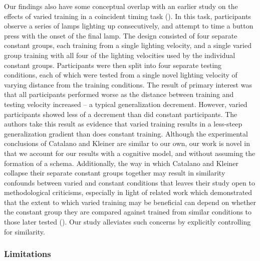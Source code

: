 \documentclass[
  11pt,
  letterpaper,
]{article}
\begin{document}
Our findings also have some conceptual overlap with an earlier study on
the effects of varied training in a coincident timing task
(). In this task, participants observe a series of lamps
lighting up consecutively, and attempt to time a button press with the
onset of the final lamp. The design consisted of four separate constant
groups, each training from a single lighting velocity, and a single
varied group training with all four of the lighting velocities used by
the individual constant groups. Participants were then split into four
separate testing conditions, each of which were tested from a single
novel lighting velocity of varying distance from the training
conditions. The result of primary interest was that all participants
performed worse as the distance between training and testing velocity
increased -- a typical generalization decrement. However, varied
participants showed less of a decrement than did constant participants.
The authors take this result as evidence that varied training results in
a less-steep generalization gradient than does constant training.
Although the experimental conclusions of Catalano and Kleiner are
similar to our own, our work is novel in that we account for our results
with a cognitive model, and without assuming the formation of a schema.
Additionally, the way in which Catalano and Kleiner collapse their
separate constant groups together may result in similarity confounds
between varied and constant conditions that leaves their study open to
methodological criticisms, especially in light of related work which
demonstrated that the extent to which varied training may be beneficial
can depend on whether the constant group they are compared against
trained from similar conditions to those later tested
(). Our study alleviates such concerns by explicitly
controlling for similarity.

\subsubsection{Limitations}\label{limitations}
\end{document}
